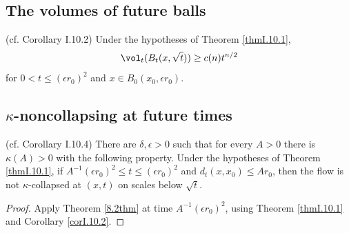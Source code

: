 \subsection{The volumes of future balls}
\begin{corollary}
  \label{cor:kl-volumes-future-balls-volume-corollary}
  (cf. Corollary I.10.2) \label{corI.10.2}
Under the hypotheses of Theorem \ref{thmI.10.1},
\begin{equation}\vol_t(B_t(x,\sqrt t))\ge c(n)t^{n/2}\end{equation}
for $0<t\le(\epsilon r_0)^2$ and $x\in B_0(x_0,\epsilon r_0)$.
\end{corollary}

\subsection{$\kappa$-noncollapsing at future times}
\begin{corollary}
  \label{cor:kl-noncollapsing-at-future-times-existence-kappa-solutions}
  (cf. Corollary I.10.4)
There are $\delta,\epsilon>0$ such that for every $A>0$ there is $\kappa(A)>0$ with
the following property. Under the hypotheses of Theorem \ref{thmI.10.1}, if
$A^{-1}(\epsilon r_0)^2\le t\le(\epsilon r_0)^2$ and $d_t(x,x_0)\le Ar_0$,
then the flow is not $\kappa$-collapsed at $(x,t)$ on scales below $\sqrt t$.
\end{corollary}
\begin{proof}
Apply Theorem \ref{8.2thm} at time $A^{-1}(\epsilon r_0)^2$, using Theorem
\ref{thmI.10.1} and Corollary \ref{corI.10.2}.
\end{proof}

